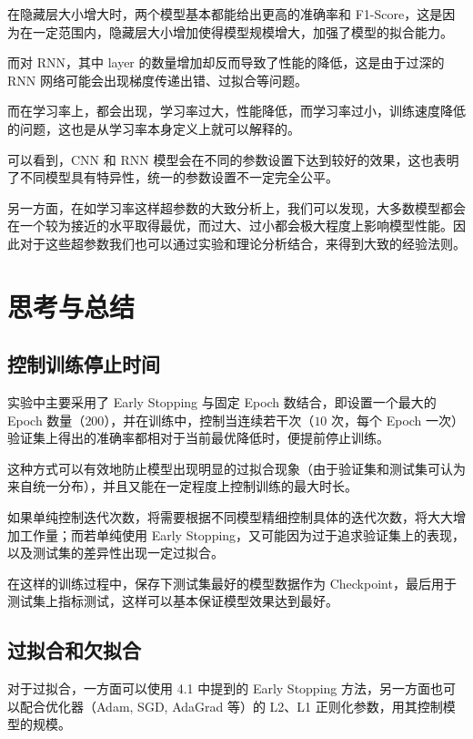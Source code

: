 \documentclass[a4paper]{article}
\begin{document}
    在隐藏层大小增大时，两个模型基本都能给出更高的准确率和 F1-Score，这是因为在一定范围内，隐藏层大小增加使得模型规模增大，加强了模型的拟合能力。

    而对 RNN，其中 layer 的数量增加却反而导致了性能的降低，这是由于过深的 RNN 网络可能会出现梯度传递出错、过拟合等问题。

    而在学习率上，都会出现，学习率过大，性能降低，而学习率过小，训练速度降低的问题，这也是从学习率本身定义上就可以解释的。

    可以看到，CNN 和 RNN 模型会在不同的参数设置下达到较好的效果，这也表明了不同模型具有特异性，统一的参数设置不一定完全公平。

    另一方面，在如学习率这样超参数的大致分析上，我们可以发现，大多数模型都会在一个较为接近的水平取得最优，而过大、过小都会极大程度上影响模型性能。因此对于这些超参数我们也可以通过实验和理论分析结合，来得到大致的经验法则。

    \newpage
    \section{思考与总结}

    \subsection{控制训练停止时间}

    实验中主要采用了 Early Stopping 与固定 Epoch 数结合，即设置一个最大的 Epoch 数量（$200$），并在训练中，控制当连续若干次（$10$ 次，每个 Epoch 一次）验证集上得出的准确率都相对于当前最优降低时，便提前停止训练。

    这种方式可以有效地防止模型出现明显的过拟合现象（由于验证集和测试集可认为来自统一分布），并且又能在一定程度上控制训练的最大时长。

    如果单纯控制迭代次数，将需要根据不同模型精细控制具体的迭代次数，将大大增加工作量；而若单纯使用 Early Stopping，又可能因为过于追求验证集上的表现，以及测试集的差异性出现一定过拟合。

    在这样的训练过程中，保存下测试集最好的模型数据作为 Checkpoint，最后用于测试集上指标测试，这样可以基本保证模型效果达到最好。

    \subsection{过拟合和欠拟合}

    对于过拟合，一方面可以使用 4.1 中提到的 Early Stopping 方法，另一方面也可以配合优化器（Adam, SGD, AdaGrad 等）的 L2、L1 正则化参数，用其控制模型的规模。
\end{document}
